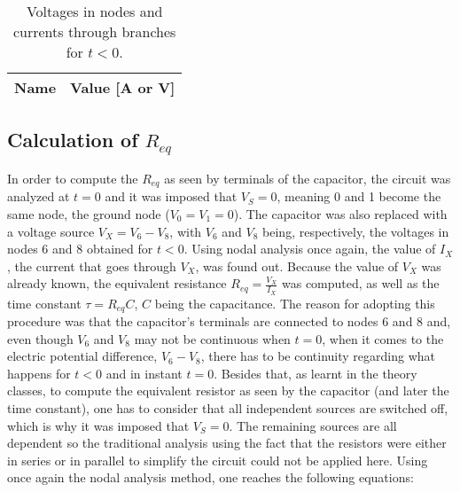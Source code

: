 
\begin{table}[H]
  \centering
  \begin{tabular}{|c|c|}
    \hline    
    {\bf Name} & {\bf Value [A or V]} \\ \hline
    
  \end{tabular}
  \caption{Voltages in nodes and currents through branches for $t<0$.}
  \label{tab:t<0}
\end{table}



\subsection{Calculation of $R_{eq}$} %
In order to compute the $R_{eq}$ as seen by terminals of the capacitor, the circuit was analyzed at $t = 0$ and it was imposed that $V_S=0$, meaning 0 and 1 become the same node, the ground node ($V_0=V_1=0$). The capacitor was also replaced with a voltage source $V_X=V_6-V_8$, with $V_6$ and $V_8$ being, respectively, the voltages in nodes 6 and 8 obtained for $t<0$.
Using nodal analysis once again, the value of $I_X$, the current that goes through $V_X$, was found out. Because the value of $V_X$ was already known, the equivalent resistance $R_{eq} = \frac{V_X}{I_X}$ was computed, as well as the time constant $\tau = R_{eq}C$, $C$ being the capacitance.
The reason for adopting this procedure was that the capacitor's terminals are connected to nodes 6 and 8 and, even though $V_6$ and $V_8$ may not be continuous when $t=0$, when it comes to the electric potential difference, $V_6-V_8$, there has to be continuity regarding what happens for $t<0$ and in instant $t=0$. Besides that, as learnt in the theory classes, to compute the equivalent resistor as seen by the capacitor (and later the time constant), one has to consider that all independent sources are switched off, which is why it was imposed that $V_S=0$. The remaining sources are all dependent so the traditional analysis using the fact that the resistors were either in series or in parallel to simplify the circuit could not be applied here.
Using once again the nodal analysis method, one reaches the following equations:

